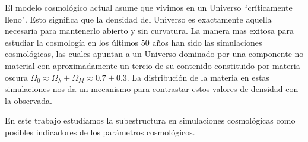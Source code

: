 
El modelo cosmológico actual asume que vivimos en un Universo ``críticamente lleno". Esto significa que la densidad  del Universo es exactamente aquella necesaria para mantenerlo abierto y sin curvatura. La manera mas exitosa para estudiar la cosmología en los últimos 50 años han sido las simulaciones cosmológicas, las cuales apuntan a un Universo dominado por una componente no material con aproximadamente un tercio de su contenido constituido por materia oscura $\Omega_0 \approx \Omega_\lambda + \Omega_M \approx 0.7+ 0.3$. La distribución de la materia en estas simulaciones nos da un mecanismo para contrastar estos valores de densidad con la observada.

En este trabajo estudiamos la subestructura en simulaciones cosmológicas como posibles indicadores de los parámetros cosmológicos.















